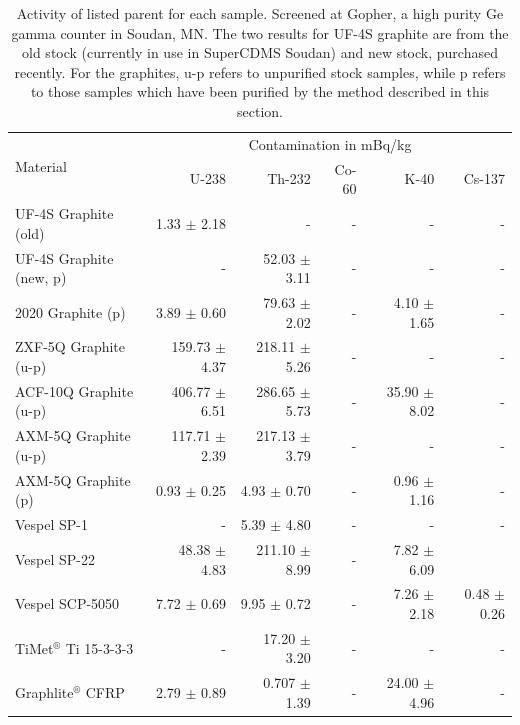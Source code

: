 \documentclass{report}
\begin{document}
\begin{table}[htb]
\centering
\begin{threeparttable}
\begin{tabular}{l|rrrrr}
\multirow{2}{*}{\large{Material}} & \multicolumn{5}{c}{Contamination in mBq/kg}\\
& U-238 & Th-232 & Co-60 & K-40 & Cs-137 \\\toprule
UF-4S Graphite (old) & 1.33 $\pm$ 2.18 & - & - & - & -\\
UF-4S Graphite (new, p) & - & 52.03 $\pm$ 3.11 &- & -& - \\
2020 Graphite (p) & 3.89 $\pm$ 0.60 & 79.63 $\pm$ 2.02 &- & 4.10 $\pm$ 1.65 &- \\
ZXF-5Q Graphite (u-p) & 159.73 $\pm$ 4.37 & 218.11 $\pm$ 5.26 & - & - & - \\
ACF-10Q Graphite (u-p) & 406.77 $\pm$ 6.51 & 286.65 $\pm$ 5.73 & -& 35.90 $\pm$ 8.02 &-\\
AXM-5Q Graphite (u-p) & 117.71 $\pm$ 2.39 & 217.13 $\pm$ 3.79 &- & -&-  \\
AXM-5Q Graphite (p) & 0.93 $\pm$ 0.25 & 4.93 $\pm$ 0.70 & -& 0.96 $\pm$ 1.16 & - \\
Vespel SP-1 & -& 5.39 $\pm$ 4.80 & -& -&-  \\
Vespel SP-22 & 48.38 $\pm$ 4.83 & 211.10 $\pm$ 8.99 &- & 7.82 $\pm$ 6.09 &\\
Vespel SCP-5050 & 7.72 $\pm$ 0.69 & 9.95 $\pm$ 0.72 &- & 7.26 $\pm$ 2.18 & 0.48 $\pm$ 0.26 \\
TiMet$^{\circledR}$ Ti 15-3-3-3 & -& 17.20 $\pm$ 3.20 &- &- & - \\
Graphlite$^{\circledR}$ CFRP & 2.79 $\pm$ 0.89 & 0.707 $\pm$ 1.39 &- & 24.00 $\pm$ 4.96 & -\\

\end{tabular}
\caption{Activity of listed parent for each sample. Screened at Gopher, a high purity Ge
gamma counter in Soudan, MN. The two results for UF-4S graphite are from the old stock (currently in use in SuperCDMS Soudan) and new stock, purchased recently. For the graphites, u-p refers to unpurified stock samples, while p refers to those samples which have been purified by the method described in this section.}
\end{threeparttable}
\end{table}
\end{document}
